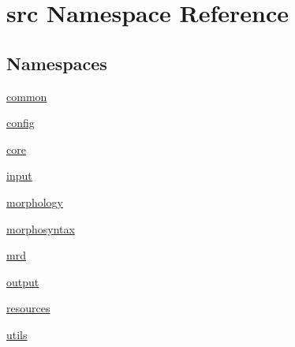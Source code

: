 \hypertarget{namespacesrc}{\section{src Namespace Reference}
\label{namespacesrc}
}
\subsection*{Namespaces}
\begin{DoxyCompactItemize}
\item 
 \hyperlink{namespacesrc_1_1common}{common}
\item 
 \hyperlink{namespacesrc_1_1config}{config}
\item 
 \hyperlink{namespacesrc_1_1core}{core}
\item 
 \hyperlink{namespacesrc_1_1input}{input}
\item 
 \hyperlink{namespacesrc_1_1morphology}{morphology}
\item 
 \hyperlink{namespacesrc_1_1morphosyntax}{morphosyntax}
\item 
 \hyperlink{namespacesrc_1_1mrd}{mrd}
\item 
 \hyperlink{namespacesrc_1_1output}{output}
\item 
 \hyperlink{namespacesrc_1_1resources}{resources}
\item 
 \hyperlink{namespacesrc_1_1utils}{utils}
\end{DoxyCompactItemize}
